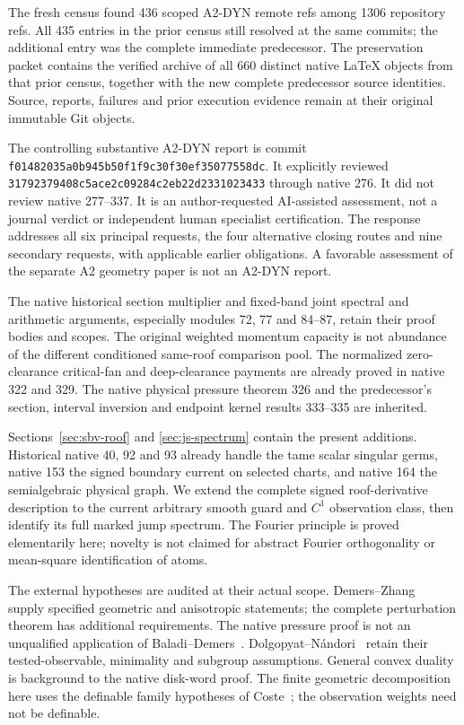 \documentclass[11pt,reqno]{amsart}
\numberwithin{equation}{section}
\theoremstyle{definition}\newtheorem{definition}[theorem]{Definition}
\theoremstyle{remark}\newtheorem{remark}[theorem]{Remark}
\begin{document}
The fresh census found 436 scoped A2-DYN remote refs among
1306 repository refs. All 435 entries in the prior census still
resolved at the same commits; the additional entry was the
complete immediate predecessor. The preservation packet contains
the verified archive of all 660 distinct native LaTeX objects
from that prior census, together with the new complete predecessor
source identities. Source, reports, failures and prior execution
evidence remain at their original immutable Git objects.

The controlling substantive A2-DYN report is commit
\texttt{f0148203\allowbreak{}5a0b945b\allowbreak{}50f1f9c3\allowbreak{}0f30ef35\allowbreak{}077558dc}.
It explicitly reviewed
\texttt{31792379\allowbreak{}408c5ace\allowbreak{}2c09284c\allowbreak{}2eb22d23\allowbreak{}31023433}
through native 276. It did not review native 277--337.
It is an author-requested AI-assisted assessment, not a journal
verdict or independent human specialist certification. The response
addresses all six principal requests, the four alternative closing
routes and nine secondary requests, with applicable earlier
obligations. A favorable assessment of the separate A2 geometry
paper is not an A2-DYN report.

The native historical section multiplier and fixed-band joint
spectral and arithmetic arguments, especially modules 72, 77
and 84--87, retain their proof bodies and scopes. The original
weighted momentum capacity is not abundance of the different
conditioned same-roof comparison pool. The normalized
zero-clearance critical-fan and deep-clearance payments are
already proved in native 322 and 329. The native physical
pressure theorem 326 and the predecessor's section, interval
inversion and endpoint kernel results 333--335 are inherited.

Sections~\ref{sec:sbv-roof} and \ref{sec:js-spectrum} contain
the present additions. Historical native 40, 92 and 93 already
handle the tame scalar singular germs, native 153 the signed
boundary current on selected charts, and native 164 the
semialgebraic physical graph. We extend the complete signed
roof-derivative description to the current arbitrary smooth
guard and $C^1$ observation class, then identify its full
marked jump spectrum. The Fourier principle is proved
elementarily here; novelty is not claimed for abstract
Fourier orthogonality or mean-square identification of atoms.

The external hypotheses are audited at their actual scope.
Demers--Zhang~\cite{DZUniform} supply specified geometric and
anisotropic statements; the complete perturbation theorem has
additional requirements. The native pressure proof is not an
unqualified application of Baladi--Demers~\cite{BDPressure}.
Dolgopyat--N\'andori~\cite{DNFlow} retain their tested-observable,
minimality and subgroup assumptions. General convex duality
\cite{BVNotes} is background to the native disk-word proof.
The finite geometric decomposition here uses the definable
family hypotheses of Coste~\cite{CosteOM}; the observation
weights need not be definable.
\end{document}
